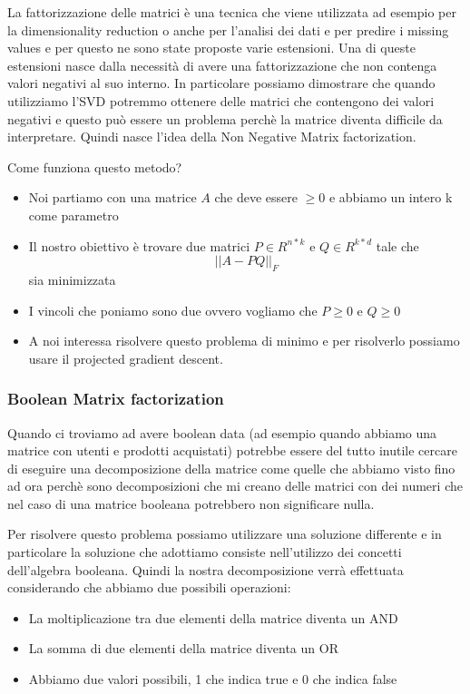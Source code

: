 \documentclass[14pt]{extreport}
\begin{document}
La fattorizzazione delle matrici è una tecnica che viene utilizzata ad esempio per la dimensionality reduction o anche per l'analisi dei dati e per
predire i missing values e per questo ne sono state proposte varie estensioni. Una di queste estensioni nasce dalla necessità di avere una
fattorizzazione che non contenga valori negativi al suo interno. In particolare possiamo dimostrare che quando utilizziamo l'SVD potremmo ottenere
delle matrici che contengono dei valori negativi e questo può essere un problema perchè la matrice diventa difficile da interpretare. Quindi nasce
l'idea della Non Negative Matrix factorization.

Come funziona questo metodo?

\begin{itemize}
	\item Noi partiamo con una matrice $A$ che deve essere $\geq 0$ e abbiamo un intero k come parametro
	\item Il nostro obiettivo è trovare due matrici $P \in R^{n*k}$ e $Q \in R^{k*d}$ tale che $$||A - PQ||_F$$ sia minimizzata
	\item I vincoli che poniamo sono due ovvero vogliamo che $P \geq 0$ e  $Q \geq 0$
	\item A noi interessa risolvere questo problema di minimo e per risolverlo possiamo usare il projected gradient descent.
\end{itemize}


\subsubsection{Boolean Matrix factorization}

Quando ci troviamo ad avere boolean data (ad esempio quando abbiamo una matrice con utenti e prodotti acquistati) potrebbe essere del tutto inutile
cercare di eseguire una decomposizione della matrice come quelle che abbiamo visto fino ad ora perchè sono decomposizioni che mi creano delle matrici
con dei numeri che nel caso di una matrice booleana potrebbero non significare nulla.

Per risolvere questo problema possiamo utilizzare una soluzione differente e in particolare la soluzione che adottiamo consiste nell'utilizzo dei
concetti dell'algebra booleana. Quindi la nostra decomposizione verrà effettuata considerando che abbiamo due possibili operazioni:
\begin{itemize}
	\item La moltiplicazione tra due elementi della matrice diventa un AND
	\item La somma di due elementi della matrice diventa un OR
	\item Abbiamo due valori possibili, 1 che indica true e 0 che indica false
\end{itemize}
\end{document}
